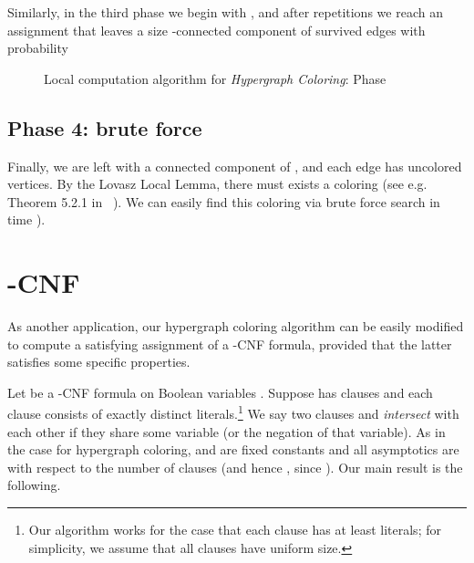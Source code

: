 \documentclass[english, oribibl]{llncs}
\begin{document}
Similarly, in the third phase we begin with , and after  repetitions
we reach an assignment that leaves a size -connected component of survived edges with probability



\begin{figure*}
\begin{center}
\end{center}
\caption{Local computation algorithm for \emph{Hypergraph Coloring}: Phase }
\label{Fig:Phase4}
\end{figure*}






\subsection{Phase 4: brute force}
Finally, we are left with a connected component of , 
and each edge has  uncolored vertices. 
By the Lovasz Local Lemma, there must exists a coloring (see e.g. Theorem 5.2.1 in ~\cite{Alo91}).
We can easily find this coloring via brute force search in time ).





\section{\texorpdfstring{-CNF}
{k-CNF}}\label{kcnf}

As another application, our hypergraph coloring algorithm can be easily modified to 
compute a satisfying assignment of a -CNF formula, 
provided that the latter satisfies some specific properties.

Let  be a -CNF formula on  Boolean variables .
Suppose  has  clauses 
and each clause consists of exactly  distinct literals.\footnote{
Our algorithm works for the case that each clause has at least  literals; 
for simplicity, we assume that all clauses have uniform size.}
We say two clauses  and  \emph{intersect} 
with each other if they
share some variable (or the negation of that variable).
As in the case for hypergraph coloring,  and  are fixed constants
and all asymptotics are with respect to the number of clauses  (and hence , since ).
Our main result is the following.
\end{document}
